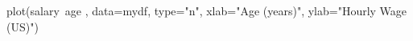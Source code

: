 \begin{Schunk}
\begin{Sinput}
 plot(salary~age , data=mydf, type="n", xlab="Age (years)", ylab="Hourly Wage (US)")
\end{Sinput}
\end{Schunk}
